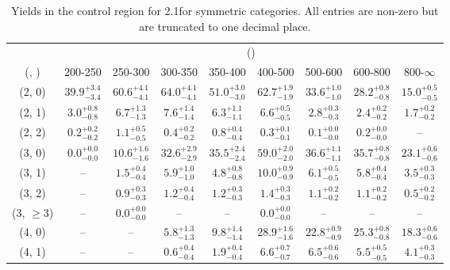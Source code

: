 \begin{table}[h!]
\tiny
\centering
\caption{Yields in the \mmj control region for 2.1\ifb for symmetric categories. All entries are non-zero but are truncated to one decimal place.\label{tab:yieldssep_mumu_ewk_sym}}
\begin{tabular}
{ccccccccc}
	\hline\hline
	& \multicolumn{8}{c}{\scalht (\gev)} \\ 
	 (\njet,  \nb) & 200-250 & 250-300 & 300-350 & 350-400 & 400-500 & 500-600 & 600-800 & 800-$\infty$ \\ [0.8ex] 
\hline
	(2, 0) & $39.9^{+ 3.4 }_{- 3.4 }$ & $60.6^{+ 4.1 }_{- 4.1 }$ & $64.0^{+ 4.1 }_{- 4.1 }$ & $51.0^{+ 3.0 }_{- 3.0 }$ & $62.7^{+ 1.9 }_{- 1.9 }$ & $33.6^{+ 1.0 }_{- 1.0 }$ & $28.2^{+ 0.8 }_{- 0.8 }$ & $15.0^{+ 0.5 }_{- 0.5 }$ \\[0.5ex] 
	(2, 1) & $3.0^{+ 0.8 }_{- 0.8 }$ & $6.7^{+ 1.3 }_{- 1.3 }$ & $7.6^{+ 1.4 }_{- 1.4 }$ & $6.3^{+ 1.1 }_{- 1.1 }$ & $6.6^{+ 0.5 }_{- 0.5 }$ & $2.8^{+ 0.3 }_{- 0.3 }$ & $2.4^{+ 0.2 }_{- 0.2 }$ & $1.7^{+ 0.2 }_{- 0.2 }$ \\[0.5ex] 
	(2, 2) & $0.2^{+ 0.2 }_{- 0.2 }$ & $1.1^{+ 0.5 }_{- 0.5 }$ & $0.4^{+ 0.2 }_{- 0.2 }$ & $0.8^{+ 0.4 }_{- 0.4 }$ & $0.3^{+ 0.1 }_{- 0.1 }$ & $0.1^{+ 0.0 }_{- 0.0 }$ & $0.2^{+ 0.0 }_{- 0.0 }$ & -- \\[0.5ex] 
	(3, 0) & $0.0^{+ 0.0 }_{- 0.0 }$ & $10.6^{+ 1.6 }_{- 1.6 }$ & $32.6^{+ 2.9 }_{- 2.9 }$ & $35.5^{+ 2.4 }_{- 2.4 }$ & $59.0^{+ 2.0 }_{- 2.0 }$ & $36.6^{+ 1.1 }_{- 1.1 }$ & $35.7^{+ 0.8 }_{- 0.8 }$ & $23.1^{+ 0.6 }_{- 0.6 }$ \\[0.5ex] 
	(3, 1) & -- & $1.5^{+ 0.4 }_{- 0.4 }$ & $5.9^{+ 1.0 }_{- 1.0 }$ & $4.8^{+ 0.8 }_{- 0.8 }$ & $10.0^{+ 0.9 }_{- 0.9 }$ & $6.1^{+ 0.5 }_{- 0.5 }$ & $5.8^{+ 0.4 }_{- 0.4 }$ & $3.5^{+ 0.3 }_{- 0.3 }$ \\[0.5ex] 
	(3, 2) & -- & $0.9^{+ 0.3 }_{- 0.3 }$ & $1.2^{+ 0.4 }_{- 0.4 }$ & $1.2^{+ 0.3 }_{- 0.3 }$ & $1.4^{+ 0.3 }_{- 0.3 }$ & $1.1^{+ 0.2 }_{- 0.2 }$ & $1.1^{+ 0.2 }_{- 0.2 }$ & $0.5^{+ 0.2 }_{- 0.2 }$ \\[0.5ex] 
	(3, $\ge3$) & -- & $0.0^{+ 0.0 }_{- 0.0 }$ & -- & -- & $0.0^{+ 0.0 }_{- 0.0 }$ & -- & -- & -- \\[0.5ex] 
	(4, 0) & -- & -- & $5.8^{+ 1.3 }_{- 1.3 }$ & $9.8^{+ 1.4 }_{- 1.4 }$ & $28.9^{+ 1.6 }_{- 1.6 }$ & $22.8^{+ 0.9 }_{- 0.9 }$ & $25.3^{+ 0.8 }_{- 0.8 }$ & $18.3^{+ 0.6 }_{- 0.6 }$ \\[0.5ex] 
	(4, 1) & -- & -- & $0.6^{+ 0.4 }_{- 0.4 }$ & $1.9^{+ 0.4 }_{- 0.4 }$ & $6.6^{+ 0.7 }_{- 0.7 }$ & $6.5^{+ 0.6 }_{- 0.6 }$ & $5.5^{+ 0.5 }_{- 0.5 }$ & $4.1^{+ 0.3 }_{- 0.3 }$ \\[0.5ex] 

\end{tabular}
\end{table}
